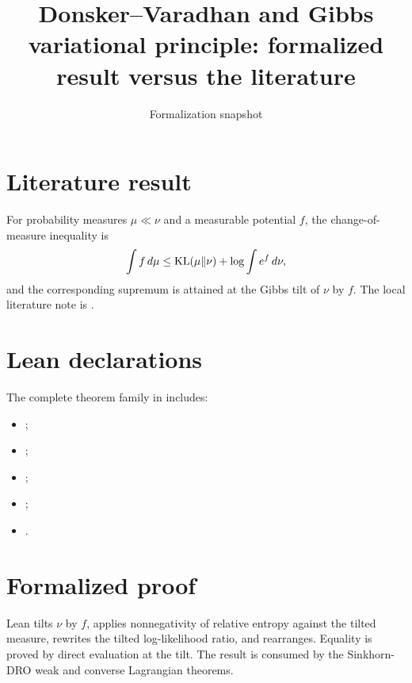 \title{Donsker--Varadhan and Gibbs variational principle: formalized result versus the literature}
\author{}
\date{Formalization snapshot \snapshot}

\maketitle
{}
\section{Literature result}
For probability measures $\mu\ll\nu$ and a measurable potential $f$, the change-of-measure inequality is
\[
 \int f\,d\mu\le \operatorname{KL}(\mu\Vert\nu)+\log\int e^f\,d\nu,
\]
and the corresponding supremum is attained at the Gibbs tilt of $\nu$ by $f$.
The local literature note is
.

\section{Lean declarations}
The complete theorem family in  includes:
\begin{itemize}[leftmargin=2em]
\item {};
\item {};
\item {};
\item {};
\item {}.
\end{itemize}

\section{Formalized proof}
Lean tilts $\nu$ by $f$, applies nonnegativity of relative entropy against the tilted measure, rewrites the tilted log-likelihood ratio, and rearranges.  Equality is proved by direct evaluation at the tilt.  The result is consumed by the Sinkhorn-DRO weak and converse Lagrangian theorems.

